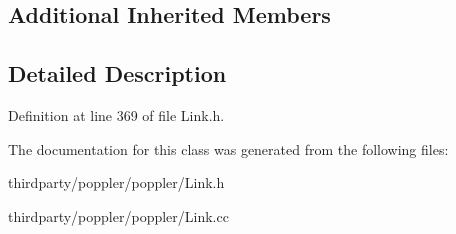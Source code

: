 \subsection*{Additional Inherited Members}


\subsection{Detailed Description}


Definition at line 369 of file Link.\+h.



The documentation for this class was generated from the following files\+:\begin{DoxyCompactItemize}
\item 
thirdparty/poppler/poppler/Link.\+h\item 
thirdparty/poppler/poppler/Link.\+cc\end{DoxyCompactItemize}
